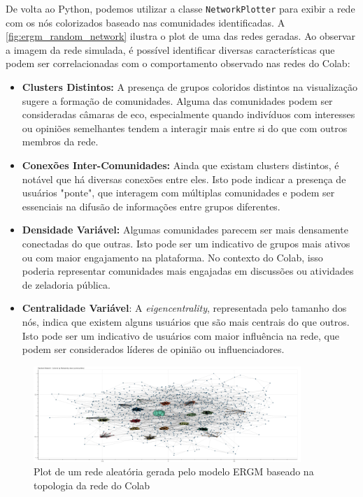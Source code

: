 De volta ao Python, podemos utilizar a classe \texttt{NetworkPlotter} para exibir a rede com os nós colorizados baseado nas comunidades identificadas. A \autoref{fig:ergm_random_network} ilustra o plot de uma das redes geradas. Ao observar a imagem da rede simulada, é possível identificar diversas características que podem ser correlacionadas com o comportamento observado nas redes do Colab:

\begin{itemize}
	\item \textbf{Clusters Distintos:} A presença de grupos coloridos distintos na visualização sugere a formação de comunidades. Alguma das comunidades podem ser consideradas câmaras de eco, especialmente quando indivíduos com interesses ou opiniões semelhantes tendem a interagir mais entre si do que com outros membros da rede.
	\item \textbf{Conexões Inter-Comunidades:} Ainda que existam clusters distintos, é notável que há diversas conexões entre eles. Isto pode indicar a presença de usuários "ponte", que interagem com múltiplas comunidades e podem ser essenciais na difusão de informações entre grupos diferentes.
	\item \textbf{Densidade Variável:} Algumas comunidades parecem ser mais densamente conectadas do que outras. Isto pode ser um indicativo de grupos mais ativos ou com maior engajamento na plataforma. No contexto do Colab, isso poderia representar comunidades mais engajadas em discussões ou atividades de zeladoria pública.
	\item \textbf{Centralidade Variável}: A \textit{eigencentrality}, representada pelo tamanho dos nós, indica que existem alguns usuários que são mais centrais do que outros. Isto pode ser um indicativo de usuários com maior influência na rede, que podem ser considerados líderes de opinião ou influenciadores.
\end{itemize}

\begin{figure}[!htb]
	\caption{Plot de um rede aleatória gerada pelo modelo ERGM baseado na topologia da rede do Colab}
	\label{fig:ergm_random_network}
	\centering
	\includegraphics[width=0.9\textwidth]{images/ergm_random_network.png}
	\fautor
\end{figure}

